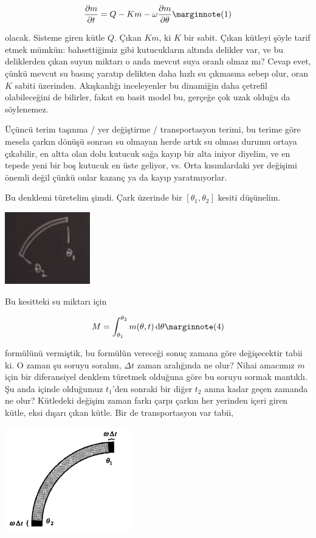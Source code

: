 \documentclass[12pt,fleqn]{article}\usepackage{../../common}
\begin{document}
$$ 
\frac{\partial m}{\partial t} = Q - Km - \omega \frac{\partial m}{\partial \theta}
\mlabel{1}
$$

olacak. Sisteme giren kütle $Q$. Çıkan $Km$, ki $K$ bir sabit. Çıkan
kütleyi şöyle tarif etmek mümkün: bahsettiğimiz gibi kutucukların altında
delikler var, ve bu deliklerden çıkan suyun miktarı o anda mevcut suya
oranlı olmaz mı?  Cevap evet, çünkü mevcut su basınç yaratıp delikten daha
hızlı su çıkmasına sebep olur, oran $K$ sabiti üzerinden. Akışkanlığı
inceleyenler bu dinamiğin daha çetrefil olabileceğini de bilirler, fakat en
basit model bu, gerçeğe çok uzak olduğu da söylenemez.

Üçüncü terim taşınma / yer değiştirme / transportasyon terimi, bu terime
göre mesela çarkın dönüşü sonrası su olmayan herde artık su olması durumu
ortaya çıkabilir, en altta olan dolu kutucuk sağa kayıp bir alta iniyor
diyelim, ve en tepede yeni bir boş kutucuk en üste geliyor, vs. Orta
kısımlardaki yer değişimi önemli değil çünkü onlar kazanç ya da kayıp
yaratmıyorlar.

Bu denklemi türetelim şimdi. Çark üzerinde bir $[\theta_1,\theta_2]$ kesiti
düşünelim.

\includegraphics[width=10em]{15_03.png}

Bu kesitteki su miktarı için

$$ 
M = \int _{\theta_1}^{\theta_2} m(\theta, t) \ud\theta 
\mlabel{4}
$$
 
formülünü vermiştik, bu formülün vereceği sonuç zamana göre değişecektir
tabii ki. O zaman şu soruyu soralım, $\Delta t$ zaman aralığında ne olur?
Nihai amacımız $m$ için bir diferansiyel denklem türetmek olduğuna göre bu
soruyu sormak mantıklı. Şu anda içinde olduğumuz $t_1$'den sonraki bir
diğer $t_2$ anına kadar geçen zamanda ne olur? Kütledeki değişim zaman
farkı çarpı çarkın her yerinden içeri giren kütle, eksi dışarı çıkan
kütle. Bir de transportasyon var tabii,

\includegraphics[width=15em]{15_04.png}
\end{document}
